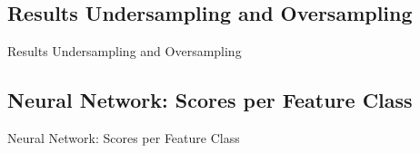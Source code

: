 \subsection{Results Undersampling and Oversampling}
\label{ssec:ruo}
\begin{table}[H]
\begin{footnotesize}

\end{footnotesize}
\caption{\label{tab:ruo} Results Undersampling and Oversampling}
\end{table}

% 


\subsection{Neural Network: Scores per Feature Class}
\label{ssec:nnfeat}
\begin{table}[H]
\begin{footnotesize}

\end{footnotesize}
\caption{\label{tab:nnfeat} Neural Network: Scores per Feature Class}
\end{table}


